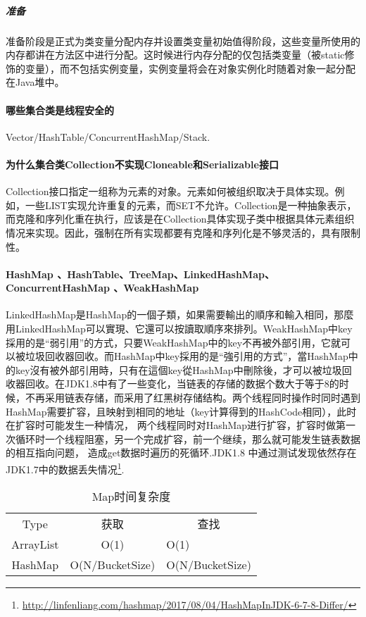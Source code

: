 \documentclass[../../../interview-questions.tex]{subfiles}
\begin{document}
\subparagraph{准备}准备阶段是正式为类变量分配内存并设置类变量初始值得阶段，这些变量所使用的内存都讲在方法区中进行分配。这时候进行内存分配的仅包括类变量（被static修饰的变量），而不包括实例变量，实例变量将会在对象实例化时随着对象一起分配在Java堆中。

\paragraph{哪些集合类是线程安全的}

Vector/HashTable/ConcurrentHashMap/Stack.


\paragraph{为什么集合类Collection不实现Cloneable和Serializable接口}

Collection接口指定一组称为元素的对象。元素如何被组织取决于具体实现。例如，一些LIST实现允许重复的元素，而SET不允许。Collection是一种抽象表示，而克隆和序列化重在执行，应该是在Collection具体实现子类中根据具体元素组织情况来实现。因此，强制在所有实现都要有克隆和序列化是不够灵活的，具有限制性。


\paragraph{HashMap 、HashTable、TreeMap、LinkedHashMap、ConcurrentHashMap 、WeakHashMap}

LinkedHashMap是HashMap的一個子類，如果需要輸出的順序和輸入相同，那麼用LinkedHashMap可以實現、它還可以按讀取順序來排列。WeakHashMap中key採用的是“弱引用”的方式，只要WeakHashMap中的key不再被外部引用，它就可以被垃圾回收器回收。而HashMap中key採用的是“強引用的方式”，當HashMap中的key沒有被外部引用時，只有在這個key從HashMap中刪除後，才可以被垃圾回收器回收。在JDK1.8中有了一些变化，当链表的存储的数据个数大于等于8的时候，不再采用链表存储，而采用了红黑树存储结构。两个线程同时操作时同时遇到HashMap需要扩容，且映射到相同的地址（key计算得到的HashCode相同），此时在扩容时可能发生一种情况， 两个线程同时对HashMap进行扩容，扩容时做第一次循环时一个线程阻塞，另一个完成扩容，前一个继续，那么就可能发生链表数据的相互指向问题， 造成get数据时遍历的死循环.JDK1.8 中通过测试发现依然存在JDK1.7中的数据丢失情况\footnote{\url{http://linfenliang.com/hashmap/2017/08/04/HashMapInJDK-6-7-8-Differ/}}.

\begin{table}[htbp]
	\caption{Map时间复杂度}
	\label{table:mapo1}
	\begin{center}
		\begin{tabular}{|c|c|p{5cm}|}
			\hline
			\multirow{1}{*}{Type}
			& \multicolumn{1}{c|}{获取} 
			& \multicolumn{1}{c|}{查找}\\			
			\cline{1-3}
			ArrayList &  O(1)  &  O(1) \\
			\hline
			HashMap &  O(N/BucketSize)  & O(N/BucketSize)  \\
			\hline							
		\end{tabular}	
	\end{center}
\end{table}
\end{document}

